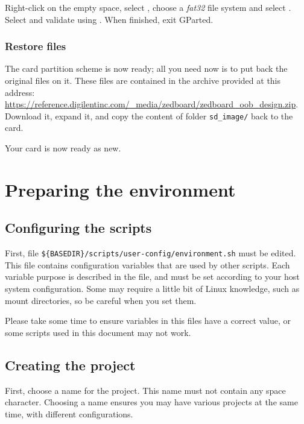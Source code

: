 \documentclass[openany,a4paper]{book}
\begin{document}
Right-click on the empty space, select , choose a \textit{fat32} file system and select .
Select  and validate using .
When finished, exit GParted.

\subsection{Restore files}

The card partition scheme is now ready; all you need now is to put back the original files on it.
These files are contained in the archive provided at this address: \url{https://reference.digilentinc.com/_media/zedboard/zedboard_oob_design.zip}.
Download it, expand it, and copy the content of folder \nolinkurl{sd_image/} back to the card.

Your card is now ready as new.


\chapter{Preparing the environment}\label{chapter_environment}

\section{Configuring the scripts}

First, file \nolinkurl{${BASEDIR}/scripts/user-config/environment.sh} must be edited.
This file contains configuration variables that are used by other scripts.
Each variable purpose is described in the file, and must be set according to your host system configuration.
Some may require a little bit of Linux knowledge, such as mount directories, so be careful when you set them.

Please take some time to ensure variables in this files have a correct value, or some scripts used in this document may not work.


\section{Creating the project}

First, choose a name for the project.
This name must not contain any space character.
Choosing a name ensures you may have various projects at the same time, with different configurations.
\end{document}
